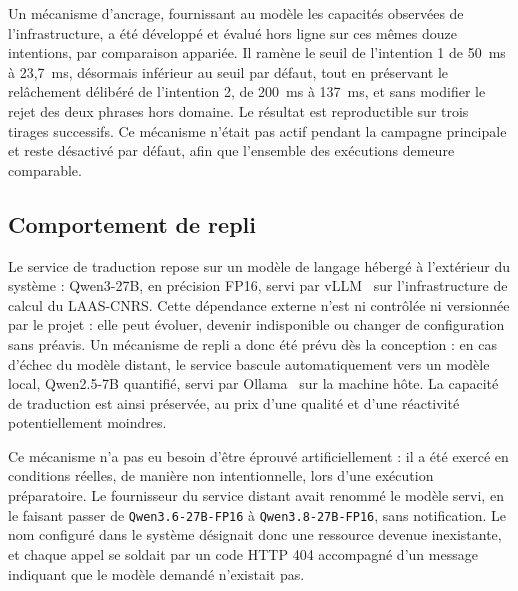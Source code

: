 Un mécanisme d'ancrage, fournissant au modèle les capacités observées de l'infrastructure, a été développé et évalué hors ligne sur ces mêmes douze intentions, par comparaison appariée. Il ramène le seuil de l'intention 1 de 50~ms à 23,7~ms, désormais inférieur au seuil par défaut, tout en préservant le relâchement délibéré de l'intention 2, de 200~ms à 137~ms, et sans modifier le rejet des deux phrases hors domaine. Le résultat est reproductible sur trois tirages successifs. Ce mécanisme n'était pas actif pendant la campagne principale et reste désactivé par défaut, afin que l'ensemble des exécutions demeure comparable.

\subsection{Comportement de repli}
\label{sec:comportement-repli}

Le service de traduction repose sur un modèle de langage hébergé à l'extérieur du système : Qwen3-27B, en précision FP16, servi par vLLM~\cite{kwon2023vllm} sur l'infrastructure de calcul du LAAS-CNRS. Cette dépendance externe n'est ni contrôlée ni versionnée par le projet : elle peut évoluer, devenir indisponible ou changer de configuration sans préavis. Un mécanisme de repli a donc été prévu dès la conception : en cas d'échec du modèle distant, le service bascule automatiquement vers un modèle local, Qwen2.5-7B quantifié, servi par Ollama~\cite{ollama} sur la machine hôte. La capacité de traduction est ainsi préservée, au prix d'une qualité et d'une réactivité potentiellement moindres.

Ce mécanisme n'a pas eu besoin d'être éprouvé artificiellement : il a été exercé en conditions réelles, de manière non intentionnelle, lors d'une exécution préparatoire. Le fournisseur du service distant avait renommé le modèle servi, en le faisant passer de \texttt{Qwen3.6-27B-FP16} à \texttt{Qwen3.8-27B-FP16}, sans notification. Le nom configuré dans le système désignait donc une ressource devenue inexistante, et chaque appel se soldait par un code HTTP 404 accompagné d'un message indiquant que le modèle demandé n'existait pas.

